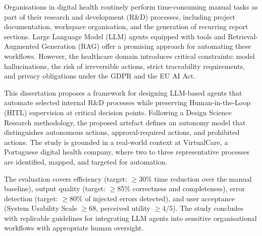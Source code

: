 \begin{abstractotherlanguage}

Organisations in digital health routinely perform time-consuming manual tasks as part of their research and development (R\&D) processes, including project documentation, workspace organisation, and the generation of recurring report sections. Large Language Model (LLM) agents equipped with tools and Retrieval-Augmented Generation (RAG) offer a promising approach for automating these workflows. However, the healthcare domain introduces critical constraints: model hallucinations, the risk of irreversible actions, strict traceability requirements, and privacy obligations under the GDPR and the EU AI Act.

This dissertation proposes a framework for designing LLM-based agents that automate selected internal R\&D processes while preserving Human-in-the-Loop (HITL) supervision at critical decision points. Following a Design Science Research methodology, the proposed artefact defines an autonomy model that distinguishes autonomous actions, approval-required actions, and prohibited actions. The study is grounded in a real-world context at VirtualCare, a Portuguese digital health company, where two to three representative processes are identified, mapped, and targeted for automation.

The evaluation covers efficiency (target: $\geq$30\% time reduction over the manual baseline), output quality (target: $\geq$85\% correctness and completeness), error detection (target: $\geq$80\% of injected errors detected), and user acceptance (System Usability Scale $\geq$68, perceived utility $\geq$4/5). The study concludes with replicable guidelines for integrating LLM agents into sensitive organisational workflows with appropriate human oversight.

\end{abstractotherlanguage}


\begin{acknowledgements}


\end{acknowledgements}


